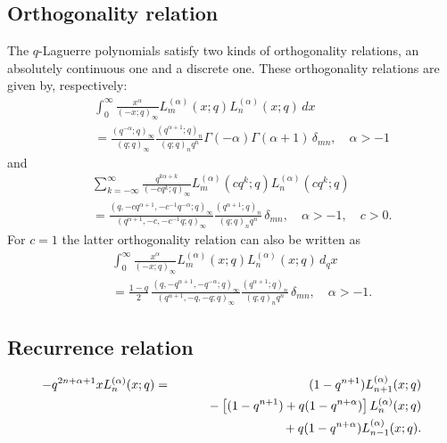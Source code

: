 \documentclass[envcountchap,graybox]{svmono}
\newcommand{\mathindent}{\hspace{7.5mm}}
\renewcommand{\Gamma}{\varGamma}
\begin{document}
{{\subsection*{Orthogonality relation}
The $q$-Laguerre polynomials satisfy two kinds of orthogonality relations, an absolutely
continuous one and a discrete one. These orthogonality relations are given by, respectively:
\begin{eqnarray}
\label{OrtqLaguerre1}
& &\int_{0}^{\infty}\frac{x^{\alpha}}{(-x;q)_{\infty}}L_m^{(\alpha)}(x;q)L_n^{(\alpha)}(x;q)\,dx\nonumber\\
& &{}=\frac{(q^{-\alpha};q)_{\infty}}{(q;q)_{\infty}}
\frac{(q^{\alpha+1};q)_n}{(q;q)_nq^n}\Gamma(-\alpha)\Gamma(\alpha+1)\,\delta_{mn},\quad\alpha>-1
\end{eqnarray}
and
\begin{eqnarray}
\label{OrtqLaguerre2}
& &\sum_{k=-\infty}^{\infty}\frac{q^{k\alpha+k}}{(-cq^k;q)_{\infty}}L_m^{(\alpha)}(cq^k;q)L_n^{(\alpha)}(cq^k;q)\nonumber\\
& &{}=\frac{(q,-cq^{\alpha+1},-c^{-1}q^{-\alpha};q)_{\infty}}
{(q^{\alpha+1},-c,-c^{-1}q;q)_{\infty}}\frac{(q^{\alpha+1};q)_n}{(q;q)_nq^n}\,\delta_{mn},
\quad\alpha>-1,\quad c>0.
\end{eqnarray}
For $c=1$ the latter orthogonality relation can also be written as
\begin{eqnarray}
\label{OrtqLaguerre3}
& &\int_0^{\infty}\frac{x^{\alpha}}{(-x;q)_{\infty}}L_m^{(\alpha)}(x;q)L_n^{(\alpha)}(x;q)\,d_qx\nonumber\\
& &{}=\frac{1-q}{2}\,\frac{(q,-q^{\alpha+1},-q^{-\alpha};q)_{\infty}}
{(q^{\alpha+1},-q,-q;q)_{\infty}}\frac{(q^{\alpha+1};q)_n}{(q;q)_nq^n}\,\delta_{mn},\quad\alpha>-1.
\end{eqnarray}

\newpage

\subsection*{Recurrence relation}
\begin{eqnarray}
\label{RecqLaguerre}
-q^{2n+\alpha+1}xL_n^{(\alpha)}(x;q)&=&(1-q^{n+1})L_{n+1}^{(\alpha)}(x;q)\nonumber\\
& &{}\mathindent{}-\left[(1-q^{n+1})+q(1-q^{n+\alpha})\right]L_n^{(\alpha)}(x;q)\nonumber\\
& &{}\mathindent\mathindent{}+q(1-q^{n+\alpha})L_{n-1}^{(\alpha)}(x;q).
\end{eqnarray}

}}
\end{document}
